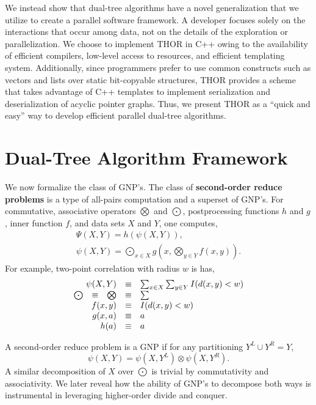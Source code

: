 \documentclass[twoside,leqno,twocolumn]{article}
\newcommand{\authornote}[1]{(\footnote{Note to self: #1})}
\newcommand{\authorsnote}[1]{\authornote{#1}}
\newcommand{\union}{\cup}
\newcommand{\Gnp}{\Psi}
\newcommand{\gnp}{\psi}
\newcommand{\defterm}[1]{{\bf #1}}
\newcommand{\kdleft}[1]{#1^{\!L}}
\newcommand{\kdright}[1]{#1^{\!R}}
\begin{document}
We instead show that dual-tree algorithms have a novel generalization that we utilize to create a parallel software framework.
A developer focuses solely on the interactions that occur among data, not on the details of the exploration or parallelization.
We choose to implement THOR in C++ owing to the availability of efficient compilers, low-level access to resources, and efficient templating system.
Additionally, since programmers prefer to use common constructs such as vectors and lists over static bit-copyable structures, THOR provides a scheme that takes advantage of C++ templates to implement serialization and deserialization of acyclic pointer graphs.
Thus, we present THOR as a ``quick and easy'' way to develop efficient parallel dual-tree algorithms.%

\section{Dual-Tree Algorithm Framework}

We now formalize the class of GNP's.
The class of \defterm{second-order reduce problems} is a type of all-pairs computation and a superset of GNP's.
For commutative, associative operators $\bigotimes$ and $\bigodot$, postprocessing functions $h$ and $g$, inner function $f$, and data sets $X$ and $Y$, one computes,
\[\begin{array}{l}
  \displaystyle \Gnp(X, Y) = h(\gnp(X, Y)),
  \\
  \displaystyle \gnp(X, Y) = \bigodot_{x \in X} g\!\left(x, \bigotimes_{y \in Y} f(x, y) \right).
\end{array}\]
\noindent
For example, two-point correlation with radius $w$ is has,
\[\begin{array}{ccccl}
  \multicolumn{3}{r}{\gnp(X, Y)} &\equiv& \sum_{x \in X} \sum_{y \in Y} I(d(x, y) < w)
  \\
  \bigodot &\equiv& \bigotimes &\equiv& \sum
  \\
  \multicolumn{3}{r}{f(x,y)} &\equiv& I(d(x,y) < w)
  \\
  \multicolumn{3}{r}{g(x, a)} &\equiv& a
  \\
  \multicolumn{3}{r}{h(a)} &\equiv& a
\end{array}\]

A second-order reduce problem is a GNP if for any partitioning $\kdleft{Y} \union \kdright{Y} = Y$,
\[\gnp(X,Y) = \gnp(X,\kdleft{Y}) \otimes \gnp(X,\kdright{Y}).\]
\noindent A similar decomposition of $X$ over $\bigodot$ is trivial by commutativity and associativity.
We later reveal how the ability of GNP's to decompose both ways is instrumental in leveraging higher-order divide and conquer.
\end{document}
